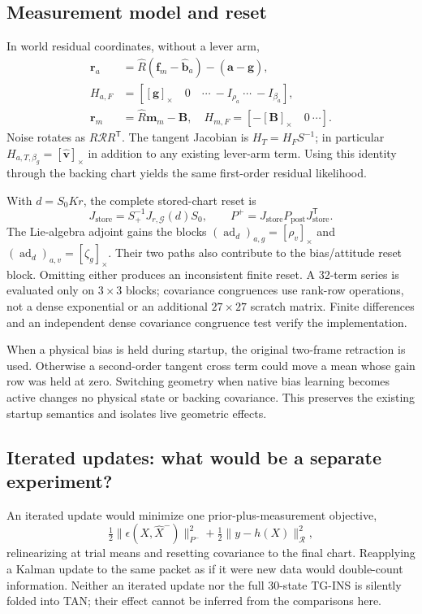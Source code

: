 \documentclass[conference]{IEEEtran}
\newcommand{\vc}[1]{\bm{#1}}
\newcommand{\sk}[1]{[#1]_\times}
\newcommand{\tr}{^{\mathsf T}}
\begin{document}
\subsection{Measurement model and reset}
In world residual coordinates, without a lever arm,
\begin{align}
 \vc r_a&=\hat R(\vc f_m-\hat{\vc b}_a)-(\hat{\vc a}-\vc g),\\
 H_{a,F}&=[\sk{\vc g}\quad0\quad\cdots\ -I_{\rho_a}\ \cdots\ -I_{\beta_a}],\\
 \vc r_m&=\hat R\vc m_m-\vc B,\quad
 H_{m,F}=[-\sk{\vc B}\quad0\ \cdots].
\end{align}
Noise rotates as $R\mathcal R R\tr$. The tangent Jacobian is
$H_T=H_F S^{-1}$; in particular
$H_{a,T,\beta_g}=\sk{\hat{\vc v}}$ in addition to any existing lever-arm
term. Using this identity through the backing chart yields the same
first-order residual likelihood.

With $d=S_0Kr$, the complete stored-chart reset is
\begin{equation}
 J_{\mathrm{store}}=S_+^{-1}J_{r,\mathcal G}(d)S_0,
 \qquad P^+=J_{\mathrm{store}}P_{\mathrm{post}}J_{\mathrm{store}}\tr.
\end{equation}
The Lie-algebra adjoint gains the blocks
$(\operatorname{ad}_d)_{a,g}=\sk{\rho_v}$ and
$(\operatorname{ad}_d)_{a,v}=\sk{\zeta_g}$. Their two paths also contribute
to the bias/attitude reset block. Omitting either produces an inconsistent
finite reset. A 32-term series is evaluated only on $3\times3$ blocks;
covariance congruences use rank-row operations, not a dense exponential or
an additional $27\times27$ scratch matrix. Finite differences and an
independent dense covariance congruence test verify the implementation.

When a physical bias is held during startup, the original two-frame
retraction is used. Otherwise a second-order tangent cross term could move
a mean whose gain row was held at zero. Switching geometry when native
bias learning becomes active changes no physical state or backing
covariance. This preserves the existing startup semantics and isolates
live geometric effects.

\subsection{Iterated updates: what would be a separate experiment?}
An iterated update would minimize one prior-plus-measurement objective,
\begin{equation}
 \tfrac12\|\epsilon(X,\hat X^-)\|_{P^-}^2+
 \tfrac12\|y-h(X)\|_{\mathcal R}^2,
\end{equation}
relinearizing at trial means and resetting covariance to the final chart.
Reapplying a Kalman update to the same packet as if it were new data would
double-count information. Neither an iterated update nor the full 30-state
TG-INS is silently folded into TAN; their effect cannot be inferred from
the comparisons here.
\end{document}
